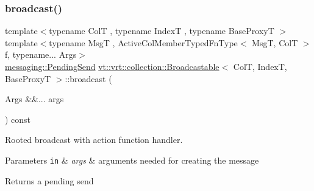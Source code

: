 \mbox{\label{structvt_1_1vrt_1_1collection_1_1_broadcastable_a96cd21a1be6313144a8c4aa3683eaa05}} 
\subsubsection{\texorpdfstring{broadcast()}{broadcast()}\hspace{0.1cm}{\footnotesize\ttfamily [3/7]}}
{\footnotesize\ttfamily template$<$typename ColT , typename IndexT , typename Base\+ProxyT $>$ \\
template$<$typename MsgT , Active\+Col\+Member\+Typed\+Fn\+Type$<$ Msg\+T, Col\+T $>$ f, typename... Args$>$ \\
\hyperlink{structvt_1_1messaging_1_1_pending_send}{messaging\+::\+Pending\+Send} \hyperlink{structvt_1_1vrt_1_1collection_1_1_broadcastable}{vt\+::vrt\+::collection\+::\+Broadcastable}$<$ ColT, IndexT, Base\+ProxyT $>$\+::broadcast (\begin{DoxyParamCaption}\item[{Args \&\&...}]{args }\end{DoxyParamCaption}) const}



Rooted broadcast with action function handler. 


\begin{DoxyParams}[1]{Parameters}
\mbox{\tt in}  & {\em args} & arguments needed for creating the message\\
\hline
\end{DoxyParams}
\begin{DoxyReturn}{Returns}
a pending send 
\end{DoxyReturn}
\mbox{\label{structvt_1_1vrt_1_1collection_1_1_broadcastable_a0a08e1ab7c78e36b3ecb5b6a4d399dab}} 
